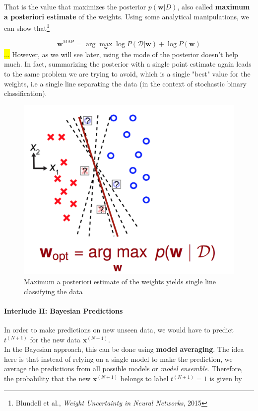 \documentclass[main]{subfiles}
\begin{document}
\noindent That is the value that maximizes the posterior $p(\bm{w}|D)$, also called \textbf{maximum a posteriori estimate} of the weights. 
Using some analytical manipulations, we can show that\footnote{Blundell et al., \textit{Weight Uncertainty in Neural Networks}, 2015}

\begin{equation}
    \bm{w}^\textrm{MAP} = \arg\max_{\bm{w}} \log P(\mathcal{D}\vert\bm{w}) + \log P(\bm{w})
\end{equation}
    \hl{...}
\noindent However, as we will see later, using the mode of the posterior doesn't help much. In fact, summarizing the posterior with a single point estimate again leads to the same problem we are trying to avoid, which is a single "best" value for the weights, i.e a single line separating the data (in the context of stochastic binary classification). 
\begin{figure}[H]
    	\centering
    	\includegraphics[width=0.6\linewidth]{05_LearningAsBayesianInference/figures/posteriormode_classifier.png}
    	\caption{Maximum a posteriori estimate of the weights yields single line classifying the data}
    	\label{fig:posterior_mode_classifier}
    \end{figure}

\paragraph{Interlude II: Bayesian Predictions}
In order to make predictions on new unseen data, we would have to predict $t^{(N+1)}$ for the new data $\bm{x}^{(N+1)}$.\\

\noindent In the Bayesian approach, this can be done using \textbf{model averaging}. The idea here is that instead of relying on a single model to make the prediction, we average the predictions from all possible models or \textit{model ensemble}. Therefore, the probability that the new $\bm{x}^{(N+1)}$ belongs to label $t^{(N+1)} = 1$ is given by
\end{document}
